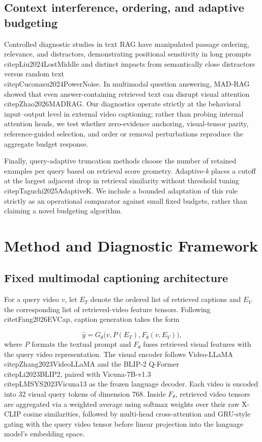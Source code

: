 \documentclass[11pt,a4paper]{article}
\begin{document}
\subsection{Context interference, ordering, and adaptive budgeting}
Controlled diagnostic studies in text RAG have manipulated passage ordering, relevance, and distractors, demonstrating positional sensitivity in long prompts \\citep{Liu2024LostMiddle} and distinct impacts from semantically close distractors versus random text \\citep{Cuconasu2024PowerNoise}. In multimodal question answering, MAD-RAG showed that even answer-containing retrieved text can disrupt visual attention \\citep{Zhao2026MADRAG}. Our diagnostics operate strictly at the behavioral input--output level in external video captioning; rather than probing internal attention heads, we test whether zero-evidence anchoring, visual-tensor parity, reference-guided selection, and order or removal perturbations reproduce the aggregate budget response.

Finally, query-adaptive truncation methods choose the number of retained examples per query based on retrieval score geometry. Adaptive-\emph{k} places a cutoff at the largest adjacent drop in retrieval similarity without threshold tuning \\citep{Taguchi2025AdaptiveK}. We include a bounded adaptation of this rule strictly as an operational comparator against small fixed budgets, rather than claiming a novel budgeting algorithm.

\section{Method and Diagnostic Framework}
\subsection{Fixed multimodal captioning architecture}
For a query video $v$, let $E_T$ denote the ordered list of retrieved captions and $E_V$ the corresponding list of retrieved-video feature tensors. Following \\citet{Fang2026EVCap}, caption generation takes the form

\begin{equation}
\widehat{y} = G_\theta\big(v, P(E_T), F_\theta(v, E_V)\big),
\end{equation}
where $P$ formats the textual prompt and $F_\theta$ fuses retrieved visual features with the query video representation. The visual encoder follows Video-LLaMA \\citep{Zhang2023VideoLLaMA} and the BLIP-2 Q-Former \\citep{Li2023BLIP2}, paired with Vicuna-7B-v1.3 \\citep{LMSYS2023Vicuna13} as the frozen language decoder. Each video is encoded into 32 visual query tokens of dimension 768. Inside $F_\theta$, retrieved video tensors are aggregated via a weighted average using softmax weights over their raw X-CLIP cosine similarities, followed by multi-head cross-attention and GRU-style gating with the query video tensor before linear projection into the language model's embedding space.
\end{document}
